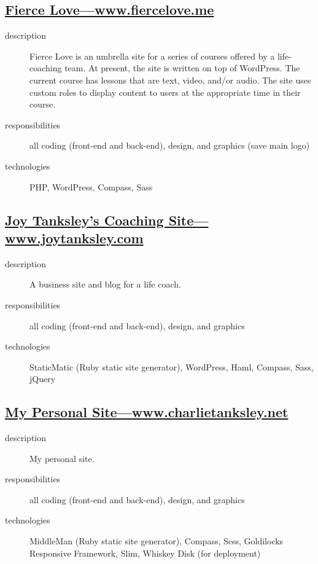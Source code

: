 \documentclass{article}
\begin{document}
\begin{multicols}{2}
\subsection{\href{http://www.fiercelove.me}
  {Fierce Love---www.fiercelove.me}}
\label{sub:Fierce Love}

\begin{description}
  \item[description] Fierce Love is an umbrella site for a series of 
    courses offered by a life-coaching team.  At present, the site is 
    written on top of WordPress.  The current course has lessons that 
    are text, video, and/or audio.  The site uses custom roles to 
    display content to users at the appropriate time in their course.
  \item[responsibilities] all coding (front-end and back-end), design, 
    and graphics (save main logo)
  \item[technologies] PHP, WordPress, Compass, Sass
\end{description}


\subsection{\href{http://www.joytanksley.com}
  {Joy Tanksley's Coaching Site---www.joytanksley.com}}
\label{sub:Joy Tanksley's Coaching Site}

\begin{description}
  \item[description] A business site and blog for a life coach. 
  \item[responsibilities] all coding (front-end and back-end), design, and graphics 
  \item[technologies] StaticMatic (Ruby static site generator), WordPress, Haml, Compass, Sass, jQuery 
\end{description}


\subsection{\href{http://www.charlietanksley.net}
  {My Personal Site---www.charlietanksley.net}}
\label{sub:My Personal Site}

\begin{description}
  \item[description] My personal site.  \item[responsibilities] all 
    coding (front-end and back-end), design, and graphics 
  \item[technologies] MiddleMan (Ruby static site generator), Compass, 
    Scss, Goldilocks Responsive Framework, Slim, Whiskey Disk (for 
    deployment)
\end{description}

\end{multicols}
\end{document}
